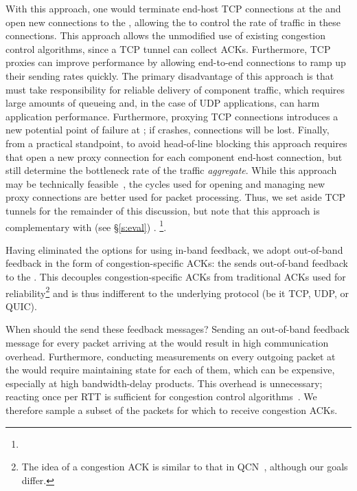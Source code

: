  With this approach, one would terminate end-host TCP connections at the \inbox and open new connections to the \outbox, allowing the \inbox to control the rate of traffic in these connections.
This approach allows the unmodified use of existing congestion control algorithms, since a TCP tunnel can collect ACKs. Furthermore, TCP proxies can improve performance by allowing end-to-end connections to ramp up their sending rates quickly.
The primary disadvantage of this approach is that \name must take responsibility for reliable delivery of component traffic, which requires large amounts of queueing and, in the case of UDP applications, can harm application performance. 
Furthermore, proxying TCP connections introduces a new potential point of failure at \name; if \name crashes, connections will be lost.
Finally, from a practical standpoint, to avoid head-of-line blocking this approach requires that \name open a new proxy connection for each component end-host connection, but still determine the bottleneck rate of the traffic \emph{aggregate}. While this approach may be technically feasible~\cite{cm}, the cycles used for opening and managing new proxy connections are better used for packet processing.
Thus, we set aside TCP tunnels for the remainder of this discussion, but note that this approach is complementary with \name (see \S\ref{s:eval}) .
\footnote{}.


 Having eliminated the options for using in-band feedback, we adopt out-of-band feedback in the form of congestion-specific ACKs: the \outbox sends out-of-band feedback to the \inbox.
This decouples congestion-specific ACKs from traditional ACKs used for reliability\footnote{The idea of a congestion ACK is similar to that in QCN~\cite{qcn}, although our goals differ.} and is thus indifferent to the underlying protocol (be it TCP, UDP, or QUIC).

When should the \outbox send these feedback messages? 
Sending an out-of-band feedback message for every packet arriving at the \outbox would result in high communication overhead. 
Furthermore, conducting measurements on every outgoing packet at the \inbox would require maintaining state for each of them, which can be expensive, especially at high bandwidth-delay products. 
This overhead is unnecessary; reacting once per RTT is sufficient for congestion control algorithms~\cite{ccp}. 
We therefore sample a subset of the packets for which to receive congestion ACKs.

